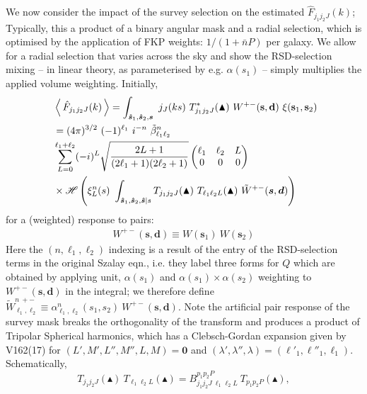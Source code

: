 \documentclass[useAMS,usenatbib]{mn2e}
\newcommand{\avg}[1]{\ensuremath{\left\langle \,#1\, \right\rangle}}
\newcommand{\tj}[6]{ \begin{pmatrix}
   #1 & #2 & #3 \\
   #4 & #5 & #6 
  \end{pmatrix}}
\newcommand{\vb}[1]{\mathbf{#1}}
\begin{document}
We now consider the impact of the survey selection on the estimated $\hat F_{j_1 j_2 J}(k)$; Typically, this a product of a binary angular mask and a radial selection, which is optimised by the application of FKP weights: $1/(1 + \bar n P)$ per galaxy.  We allow for a radial selection that varies across the sky and show the RSD-selection mixing -- in linear theory, as parameterised by e.g. $\alpha(s_1)$ -- simply multiplies the applied volume weighting.  
Initially, 
\begin{align}
&\avg{\hat{F}_{j_1 j_2 J}(k)} = \int_{\boldsymbol {\hat s}_1, \boldsymbol {\hat s}_2, \boldsymbol {s}} 
\ j_J(ks) \ T^{*}_{j_1 j_2 J}(\blacktriangle) \ W^{+-}(\vb{s}, \vb{d}) \ \xi(\vb{s}_1,\vb{s}_2) \notag \\
 &=
 (4 \pi)^{3/2} \ (-1)^{\ell_1} \ i^{-n} \ \tilde \beta^n_{\ell_1 \ell_2} \notag \\ 
 &\sum_{L=0}^{\ell_1 + \ell_2} (-i)^L \sqrt{\frac{2L+1}{(2\ell_1 +1)(2 \ell_2 +1)}} \tj{\ell_1}{\ell_2}{L}{0}{0}{0} \notag \\ \ & \times \mathcal{H} \left ( \xi^{n}_{L}(s) \ 
 \int_{\boldsymbol{\hat s}_1, \boldsymbol{\hat s}_2, \boldsymbol{\hat s} | s} T_{j_1 j_2 J}(\blacktriangle) \ T_{\ell_1 \ell_2 L}(\blacktriangle) \ \tilde{W}^{+-}(\boldsymbol s, \boldsymbol d) \right ) 
\end{align}
for a (weighted) response to pairs: 
\begin{align}
W^{+-}(\vb{s},\vb{d}) \equiv W(\vb{s}_1) \ W(\vb{s}_2) 
\end{align}
Here the $(n, \ell_1, \ell_2)$ indexing is a result of the entry of the RSD-selection terms in the original Szalay eqn., i.e. they label three forms for $Q$ which are obtained by applying unit, $\alpha(s_1)$ and $\alpha(s_1) \times \alpha(s_2)$ weighting to $W^{+-}(\boldsymbol{s}, \vb{d})$ in the integral; we therefore define $\tilde W^{n \ +-}_{\ell_1, \ell_2} \equiv \alpha^{n}_{\ell_1, \ell_2}(s_1, s_2) \ W^{+-}(\boldsymbol s, \boldsymbol d)$.  Note the artificial pair response of the survey mask breaks the orthogonality of the transform and produces a product of Tripolar Spherical harmonics, which has a Clebsch-Gordan expansion given by V162(17) for $(L', M', L'', M'', L, M) = \boldsymbol 0$ and $(\lambda', \lambda'', \lambda) = ({\ell}'_1, \ell''_1, \ell_1)$.  Schematically, 
\begin{equation}
T_{j_1 j_2 J}(\blacktriangle) \ T_{\ell_1 \ell_2 L}(\blacktriangle) = B^{p_1 p_2 P}_{j_1 j_2 J \ \ell_1 \ell_2 L} \ T_{p_1 p_2 P}(\blacktriangle),  
\end{equation}
\end{document}
